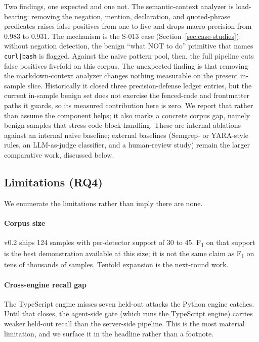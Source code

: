 Two findings, one expected and one not. The semantic-context analyzer is
load-bearing: removing the negation, mention, declaration, and
quoted-phrase predicates raises false positives from one to five and
drops macro precision from 0.983 to 0.931. The mechanism is the S-013
case (Section~\ref{sec:case-studies}): without negation detection, the
benign ``what NOT to do'' primitive that names \texttt{curl|bash} is
flagged. Against the naive pattern pool, then, the full pipeline cuts
false positives fivefold on this corpus. The unexpected finding is that
removing the markdown-context analyzer changes nothing measurable on the
present in-sample slice. Historically it closed three precision-defense
ledger entries, but the current in-sample benign set does not exercise
the fenced-code and frontmatter paths it guards, so its measured
contribution here is zero. We report that rather than assume the
component helps; it also marks a concrete corpus gap, namely benign
samples that stress code-block handling. These are internal ablations
against an internal naive baseline; external baselines (Semgrep- or
YARA-style rules, an LLM-as-judge classifier, and a human-review study)
remain the larger comparative work, discussed below.

\subsection{Limitations (RQ4)}
\label{subsec:eval-limitations}

We enumerate the limitations rather than imply there are none.

\paragraph{Corpus size} v0.2 ships 124 samples with per-detector support
of 30 to 45. F\textsubscript{1} on that support is the best
demonstration available at this size; it is not the same claim as
F\textsubscript{1} on tens of thousands of samples. Tenfold expansion is
the next-round work.

\paragraph{Cross-engine recall gap} The TypeScript engine misses seven
held-out attacks the Python engine catches. Until that closes, the
agent-side gate (which runs the TypeScript engine) carries weaker
held-out recall than the server-side pipeline. This is the most
material limitation, and we surface it in the headline rather than a
footnote.

